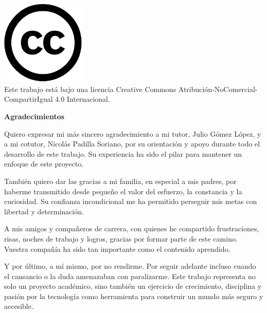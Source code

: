 \documentclass[11pt,a4paper,twoside]{report}
\begin{document}
	
	
\cleardoublepage

	
	\thispagestyle{empty}
	\cleardoublepage
	\thispagestyle{empty}
	
	
	
	\newpage
	\thispagestyle{empty}
	\begin{center}
		\vspace*{\fill}
		\includegraphics[width=0.3\textwidth]{adicional/cc.xlarge.png}\\
		Este trabajo está bajo una licencia Creative Commons Atribución-NoComercial-CompartirIgual 4.0 Internacional.
		\vspace*{\fill}
	\end{center}
	
	\newpage
	\thispagestyle{empty}
	\null
	\newpage
	
	\cleardoublepage
	\thispagestyle{empty}
	{
		\begin{center}
			\Large\bfseries Agradecimientos
		\end{center}
		
		\vspace{1cm}
		
		Quiero expresar mi más sincero agradecimiento a mi tutor, Julio Gómez López, y a mi cotutor, Nicolás Padilla Soriano, por su orientación y apoyo durante
		todo el desarrollo de este trabajo. Su experiencia ha sido el pilar para mantener un enfoque de este proyecto.\newline
		
		También quiero dar las gracias a mi familia, en especial a mis padres, por haberme transmitido desde pequeño el valor del esfuerzo, la constancia y la curiosidad.
	    Su confianza incondicional me ha permitido perseguir mis metas con libertad y determinación.\newline
		
		A mis amigos y compañeros de carrera, con quienes he compartido frustraciones, risas, noches de trabajo y logros, gracias por formar parte de este camino.
		Vuestra compañía ha sido tan importante como el contenido aprendido.\newline
		
		Y por último, a mí mismo, por no rendirme. Por seguir adelante incluso cuando el cansancio o la duda amenazaban con paralizarme. Este trabajo representa no
		solo un proyecto académico, sino también un ejercicio de crecimiento, disciplina y pasión por la tecnología como herramienta para construir un mundo más seguro y accesible.
		
		\vfill
	}
	
\end{document}
